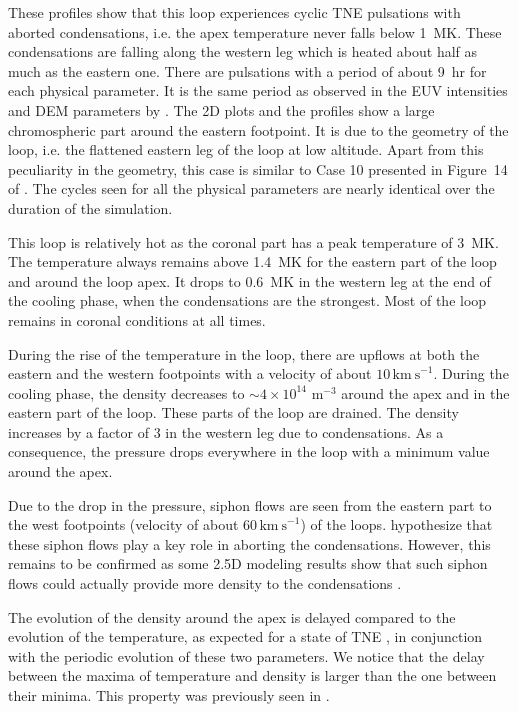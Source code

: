 \documentclass[preprint2]{aastex6}
\begin{document}
\medskip

These profiles show that this loop experiences cyclic TNE pulsations with aborted condensations, i.e. the apex temperature never falls below 1~MK. These condensations are falling along the western leg which is heated about half as much as the eastern one. There are pulsations with a period of about 9~hr for each physical parameter. It is the same period as observed in the EUV intensities and DEM parameters by \citet{froment2015}. The 2D plots and the profiles show a large chromospheric part around the eastern footpoint. It is due to the geometry of the loop, i.e. the flattened eastern leg of the loop at low altitude. Apart from this peculiarity in the geometry, this case is similar to Case 10 presented in Figure~14 of \citet{mikic2013}. The cycles seen for all the physical parameters are nearly identical over the duration of the simulation. 

This loop is relatively hot as the coronal part has a peak temperature of 3~MK. The temperature always remains above 1.4~MK for the eastern part of the loop and around the loop apex. It drops to 0.6~MK in the western leg at the end of the cooling phase, when the condensations are the strongest. Most of the loop remains in coronal conditions at all times.

During the rise of the temperature in the loop, there are upflows at both the eastern and the western footpoints with a velocity of about $10 \, \mathrm{km~s}^{-1}$.
During the cooling phase, the density decreases to $\sim 4 \times 10^{14}$ m$^{-3}$ around the apex and in the eastern part of the loop. These parts of the loop are drained. The density increases by a factor of 3 in the western leg due to condensations. 
As a consequence, the pressure drops everywhere in the loop with a minimum value around the apex.

Due to the drop in the pressure, siphon flows are seen from the eastern part to the west footpoints (velocity of about $60 \, \mathrm{km~s}^{-1}$) of the loops.
 \citet{mikic2013} hypothesize that these siphon flows play a key role in aborting the condensations. However, this remains to be confirmed as some 2.5D modeling results show that such siphon flows could actually provide more density to the condensations \citep{fang_coronal_2015}.

The evolution of the density around the apex is delayed compared to the evolution of the temperature, as expected for a state of TNE \citep[e.g.][]{mikic2013}, in conjunction with the periodic evolution of these two parameters. We notice that the delay between the maxima of temperature and density is larger than the one between their minima. This property was previously seen in \cite[see Figure~6]{mikic2013}.
	
\end{document}
